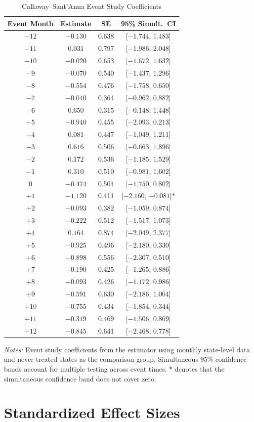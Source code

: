 \documentclass[12pt]{article}
\begin{document}
\begin{table}[H]
\centering
\caption{Callaway--Sant'Anna Event Study Coefficients}
\begin{threeparttable}
\begin{tabular}{cccc}
\toprule
Event Month & Estimate & SE & 95\% Simult.\ CI \\
\midrule
$-12$ & $-0.130$ & 0.638 & [$-1.744$, $1.483$] \\
$-11$ & $0.031$ & 0.797 & [$-1.986$, $2.048$] \\
$-10$ & $-0.020$ & 0.653 & [$-1.672$, $1.632$] \\
$-9$ & $-0.070$ & 0.540 & [$-1.437$, $1.296$] \\
$-8$ & $-0.554$ & 0.476 & [$-1.758$, $0.650$] \\
$-7$ & $-0.040$ & 0.364 & [$-0.962$, $0.882$] \\
$-6$ & $0.650$ & 0.315 & [$-0.148$, $1.448$] \\
$-5$ & $-0.940$ & 0.455 & [$-2.093$, $0.213$] \\
$-4$ & $0.081$ & 0.447 & [$-1.049$, $1.211$] \\
$-3$ & $0.616$ & 0.506 & [$-0.663$, $1.896$] \\
$-2$ & $0.172$ & 0.536 & [$-1.185$, $1.529$] \\
$-1$ & $0.310$ & 0.510 & [$-0.981$, $1.602$] \\
\midrule
$0$ & $-0.474$ & 0.504 & [$-1.750$, $0.802$] \\
$+1$ & $-1.120$ & 0.411 & [$-2.160$, $-0.081$]* \\
$+2$ & $-0.093$ & 0.382 & [$-1.059$, $0.874$] \\
$+3$ & $-0.222$ & 0.512 & [$-1.517$, $1.073$] \\
$+4$ & $0.164$ & 0.874 & [$-2.049$, $2.377$] \\
$+5$ & $-0.925$ & 0.496 & [$-2.180$, $0.330$] \\
$+6$ & $-0.898$ & 0.556 & [$-2.307$, $0.510$] \\
$+7$ & $-0.190$ & 0.425 & [$-1.265$, $0.886$] \\
$+8$ & $-0.093$ & 0.426 & [$-1.172$, $0.986$] \\
$+9$ & $-0.591$ & 0.630 & [$-2.186$, $1.004$] \\
$+10$ & $-0.755$ & 0.434 & [$-1.854$, $0.344$] \\
$+11$ & $-0.319$ & 0.469 & [$-1.506$, $0.869$] \\
$+12$ & $-0.845$ & 0.641 & [$-2.468$, $0.778$] \\
\bottomrule
\end{tabular}
\begin{tablenotes}[flushleft]
\small
\item \textit{Notes:} Event study coefficients from the \citet{callaway2021} estimator using monthly state-level data and never-treated states as the comparison group. Simultaneous 95\% confidence bands account for multiple testing across event times. * denotes that the simultaneous confidence band does not cover zero.
\end{tablenotes}
\end{threeparttable}
\label{tab:es}
\end{table}


\section{Standardized Effect Sizes}
\label{sec:sde}


\end{document}
